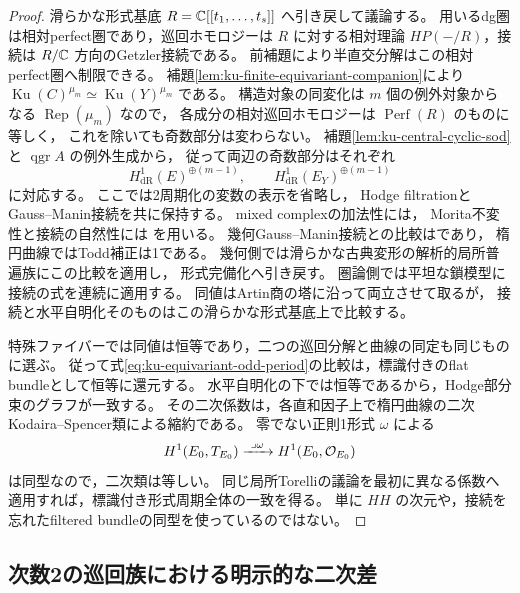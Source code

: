\begin{proof}
滑らかな形式基底 $R=\mathbb C[[t_1,\ldots,t_s]]$ へ引き戻して議論する。
用いるdg圏は相対perfect圏であり，巡回ホモロジーは $R$ に対する相対理論
$HP(-/R)$，接続は $R/\mathbb C$ 方向のGetzler接続である。
前補題により半直交分解はこの相対perfect圏へ制限できる。
補題\ref{lem:ku-finite-equivariant-companion}により
$\operatorname{Ku}(C)^{\mu_m}\simeq\operatorname{Ku}(Y)^{\mu_m}$ である。
構造対象の同変化は $m$ 個の例外対象からなる $\operatorname{Rep}(\mu_m)$ なので，
各成分の相対巡回ホモロジーは $\operatorname{Perf}(R)$ のものに等しく，
これを除いても奇数部分は変わらない。
補題\ref{lem:ku-central-cyclic-sod}と $\operatorname{qgr}A$ の例外生成から，
従って両辺の奇数部分はそれぞれ
\begin{equation}\label{eq:ku-equivariant-odd-period}
 H^1_{\mathrm{dR}}(E)^{\oplus(m-1)},
 \qquad H^1_{\mathrm{dR}}(E_Y)^{\oplus(m-1)}
\end{equation}
に対応する。
ここでは2周期化の変数の表示を省略し，
Hodge filtrationとGauss--Manin接続を共に保持する。
mixed complexの加法性には\cite[Section~5.1, Theorem~5.2(a)]{KellerDG2006}，
Morita不変性と接続の自然性には
\cite[Theorem~3.32, Corollary~4.13]{Sheridan2020}を用いる。
幾何Gauss--Manin接続との比較は\cite[Theorem~0.1(3)]{Tu2024}であり，
楕円曲線ではTodd補正は1である。
幾何側では滑らかな古典変形の解析的局所普遍族にこの比較を適用し，
形式完備化へ引き戻す。
圏論側では平坦な鎖模型に接続の式を連続に適用する。
同値はArtin商の塔に沿って両立させて取るが，
接続と水平自明化そのものはこの滑らかな形式基底上で比較する。

特殊ファイバーでは同値は恒等であり，二つの巡回分解と曲線の同定も同じものに選ぶ。
従って式\eqref{eq:ku-equivariant-odd-period}の比較は，標識付きのflat bundleとして恒等に還元する。
水平自明化の下では恒等であるから，Hodge部分束のグラフが一致する。
その二次係数は，各直和因子上で楕円曲線の二次Kodaira--Spencer類による縮約である。
零でない正則1形式 $\omega$ による
\[
 H^1(E_0,T_{E_0})\xrightarrow{\ \lrcorner\omega\ }H^1(E_0,\OO_{E_0})
\]
は同型なので，二次類は等しい。
同じ局所Torelliの議論を最初に異なる係数へ適用すれば，標識付き形式周期全体の一致を得る。
単に $HH$ の次元や，接続を忘れたfiltered bundleの同型を使っているのではない。
\end{proof}

\subsection{次数2の巡回族における明示的な二次差}

